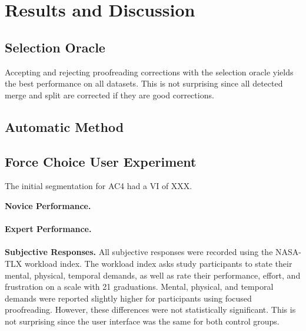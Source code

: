 \section{Results and Discussion}




\subsection{Selection Oracle}
Accepting and rejecting proofreading corrections with the selection oracle yields the best performance on all datasets. This is not surprising since all detected merge and split are corrected if they are good corrections.


\subsection{Automatic Method}

\subsection{Force Choice User Experiment}

The initial segmentation for AC4 had a VI of XXX. 

\textbf{Novice Performance.} 
\\~\\
\textbf{Expert Performance.}
\\~\\
\textbf{Subjective Responses.} All subjective responses were recorded using the NASA-TLX workload index. The workload index asks study participants to state their mental, physical, temporal demands, as well as rate their performance, effort, and frustration on a scale with 21 graduations. Mental, physical, and temporal demands were reported slightly higher for participants using focused proofreading. However, these differences were not statistically significant. This is not surprising since the user interface was the same for both control groups.
